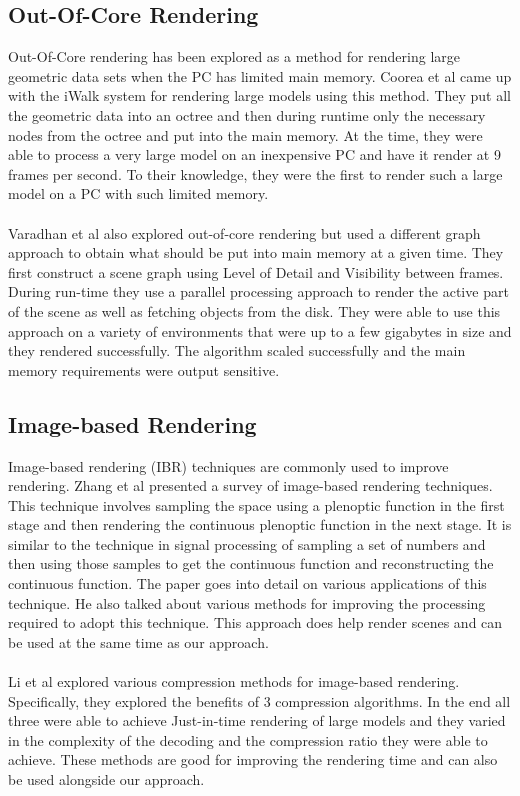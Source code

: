 \documentclass[11pt,psfig]{article}
\begin{document}
\subsection*{Out-Of-Core Rendering}

Out-Of-Core rendering has been explored as a method for rendering large geometric data sets when the PC has limited main memory. Coorea et al \cite{iwalk} came up with the iWalk system for rendering large models using this method. They put all the geometric data into an octree and then during runtime only the necessary nodes from the octree and put into the main memory. At the time, they were able to process a very large model on an inexpensive PC and have it render at 9 frames per second. To their knowledge, they were the first to render such a large model on a PC with such limited memory. \\
\\
Varadhan et al \cite{outofcore} also explored out-of-core rendering but used a different graph approach to obtain what should be put into main memory at a given time. They first construct a scene graph using Level of Detail and Visibility between frames. During run-time they use a parallel processing approach to render the active part of the scene as well as fetching objects from the disk. They were able to use this approach on a variety of environments that were up to a few gigabytes in size and they rendered successfully. The algorithm scaled successfully and the main memory requirements were output sensitive. 

\subsection*{Image-based Rendering}

Image-based rendering (IBR) techniques are commonly used to improve rendering. Zhang et al \cite{imagebasedrendering} presented a survey of image-based rendering techniques. This technique involves sampling the space using a plenoptic function in the first stage and then rendering the continuous plenoptic function in the next stage. It is similar to the technique in signal processing of sampling a set of numbers and then using those samples to get the continuous function and reconstructing the continuous function. The paper goes into detail on various applications of this technique. He also talked about various methods for improving the processing required to adopt this technique. This approach does help render scenes and can be used at the same time as our approach. \\
\\
Li et al \cite{compressionimagebased} explored various compression methods for image-based rendering. Specifically, they explored the benefits of 3 compression algorithms. In the end all three were able to achieve Just-in-time rendering of large models and they varied in the complexity of the decoding and the compression ratio they were able to achieve. These methods are good for improving the rendering time and can also be used alongside our approach. 
\end{document}
